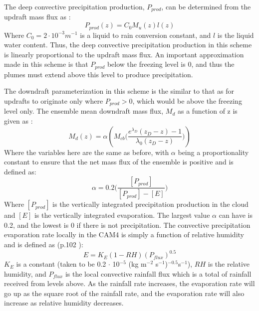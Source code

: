 \documentclass[letterpaper,12pt,titlepage,oneside,final]{book}
\begin{document}
The deep convective precipitation production, $P_{prod}$, can be determined from the updraft mass flux as \citep{zhang_sensitivity_1995}:
\begin{equation}\label{eq:pprod}
P_{prod}(z)=C_{0}M_{u}(z)l(z)
\end{equation}
Where $C_{0}=2\cdot{10^{-3}} m^{-1}$ is a liquid to rain conversion constant, and $l$ is the liquid water content. Thus, the deep convective precipitation production in this scheme is linearly proportional to the updraft mass flux. An important approximation made in this scheme is that $P_{prod}$ below the freezing level is 0, and thus the plumes must extend above this level to produce precipitation. 

The downdraft parameterization in this scheme is the similar to that as for updrafts to originate only where $P_{prod} > 0$, which would be above the freezing level only. The ensemble mean downdraft mass flux, $M_{d}$ as a function of z is given as \citep{zhang_sensitivity_1995}:
\begin{equation}\label{eq:down}
M_{d}(z)=\alpha(M_{cb}\Bigg(\frac{e^{\lambda_{D}}(z_{D}-z)-1}{\lambda_{0}(z_{D}-z)}\Bigg))
\end{equation}
Where the variables here are the same as before, with $\alpha$ being a proportionality constant to ensure that the net mass flux of the ensemble is positive and is defined as:
\begin{equation}
\alpha=0.2\Bigg(\frac{[P_{prod}]}{[P_{prod}]-[E]}\Bigg)
\end{equation}
Where $[P_{prod}]$ is the vertically integrated precipitation production in the cloud and $[E]$ is the vertically integrated evaporation. The largest value $\alpha$ can have is 0.2, and the lowest is 0 if there is not precipitation. The convective precipitation evaporation rate locally in the CAM4 is simply a function of relative humidity and is defined as (p.102 \cite{neale_description_2010}):
\begin{equation}\label{eq:evap}
E=K_{E}(1-RH)(P_{flux})^{0.5}
\end{equation}
$K_{E}$ is a constant (taken to be 0.2 $\cdot$ 10$^{-5}$ (kg m$^{-2}$ s$^{-1}$)$^{-0.5}$s$^{-1}$), $RH$ is the relative humidity, and $P_{flux}$ is the local convective rainfall flux which is a total of rainfall received from levels above. As the rainfall rate increases, the evaporation rate will go up as the square root of the rainfall rate, and the evaporation rate will also increase as relative humidity decreases. 
\\
\end{document}
